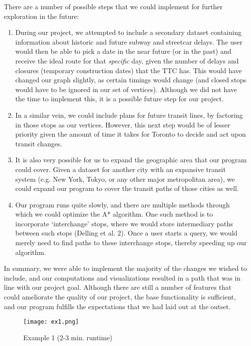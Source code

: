 \documentclass[fontsize=11pt]{article}
\begin{document}
    There are a number of possible steps that we could implement for further exploration in the future:
    \begin{enumerate}
        \item During our project, we attempted to include a secondary dataset containing information about historic and future subway and streetcar delays. The user would then be able to pick a date in the near future (or in the past) and receive the ideal route for that \emph{specific} day, given the number of delays and closures (temporary construction dates) that the TTC has. This would have changed our graph slightly, as certain timings would change (and closed stops would have to be ignored in our set of vertices). Although we did not have the time to implement this, it is a possible future step for our project.
        \item In a similar vein, we could include plans for future transit lines, by factoring in those stops as our vertices. However, this next step would be of lesser priority given the amount of time it takes for Toronto to decide and act upon transit changes.
        \item It is also very possible for us to expand the geographic area that our program could cover. Given a dataset for another city with an expansive transit system (e.g. New York, Tokyo, or any other major metropolitan area), we could expand our program to cover the transit paths of those cities as well.
        \item Our program runs quite slowly, and there are multiple methods through which we could optimize the A* algorithm. One such method is to incorporate `interchange' stops, where we would store intermediary paths between such stops (Delling et al. 2). Once a user starts a query, we would merely need to find paths to these interchange stops, thereby speeding up our algorithm.
    \end{enumerate}

    In summary, we were able to implement the majority of the changes we wished to include, and our computations and visualizations resulted in a path that was in line with our project goal. Although there are still a number of features that could ameliorate the quality of our project, the base functionality is sufficient, and our program fulfills the expectations that we had laid out at the outset.

    \newpage

    \begin{figure}[hbp]
        \centering
        \texttt{[image: ex1.png]}
        \caption{Example 1 (2-3 min. runtime)}
        \label{fig:ex1}
    \end{figure}
\end{document}
